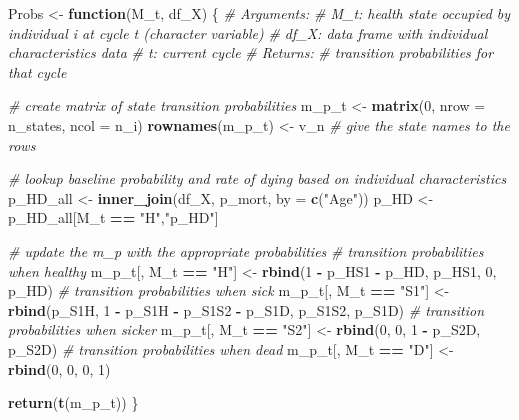 \documentclass[
]{article}
\newenvironment{Shaded}{\begin{snugshade}}{\end{snugshade}}
\newcommand{\CommentTok}[1]{\textcolor[rgb]{0.56,0.35,0.01}{\textit{#1}}}
\newcommand{\ControlFlowTok}[1]{\textcolor[rgb]{0.13,0.29,0.53}{\textbf{#1}}}
\newcommand{\DataTypeTok}[1]{\textcolor[rgb]{0.13,0.29,0.53}{#1}}
\newcommand{\DecValTok}[1]{\textcolor[rgb]{0.00,0.00,0.81}{#1}}
\newcommand{\KeywordTok}[1]{\textcolor[rgb]{0.13,0.29,0.53}{\textbf{#1}}}
\newcommand{\NormalTok}[1]{#1}
\newcommand{\OperatorTok}[1]{\textcolor[rgb]{0.81,0.36,0.00}{\textbf{#1}}}
\newcommand{\StringTok}[1]{\textcolor[rgb]{0.31,0.60,0.02}{#1}}
\begin{document}
\begin{Shaded}
\begin{Highlighting}[]
\NormalTok{Probs <-}\StringTok{ }\ControlFlowTok{function}\NormalTok{(M_t, df_X) \{ }
  \CommentTok{# Arguments:}
    \CommentTok{# M_t: health state occupied by individual i at cycle t (character variable)}
    \CommentTok{# df_X:     data frame with individual characteristics data }
  \CommentTok{# t:     current cycle }
\CommentTok{# Returns: }
  \CommentTok{#   transition probabilities for that cycle}
  
  \CommentTok{# create matrix of state transition probabilities  }
\NormalTok{  m_p_t           <-}\StringTok{ }\KeywordTok{matrix}\NormalTok{(}\DecValTok{0}\NormalTok{, }\DataTypeTok{nrow =}\NormalTok{ n_states, }\DataTypeTok{ncol =}\NormalTok{ n_i) }
  \KeywordTok{rownames}\NormalTok{(m_p_t) <-}\StringTok{  }\NormalTok{v_n  }\CommentTok{# give the state names to the rows}
  
  \CommentTok{# lookup baseline probability and rate of dying based on individual characteristics}
\NormalTok{  p_HD_all <-}\StringTok{ }\KeywordTok{inner_join}\NormalTok{(df_X, p_mort, }\DataTypeTok{by =} \KeywordTok{c}\NormalTok{(}\StringTok{"Age"}\NormalTok{))}
\NormalTok{  p_HD     <-}\StringTok{ }\NormalTok{p_HD_all[M_t }\OperatorTok{==}\StringTok{ "H"}\NormalTok{,}\StringTok{"p_HD"}\NormalTok{]}
  
  \CommentTok{# update the m_p with the appropriate probabilities   }
  \CommentTok{# transition probabilities when healthy}
\NormalTok{  m_p_t[, M_t }\OperatorTok{==}\StringTok{ "H"}\NormalTok{]  <-}\StringTok{ }\KeywordTok{rbind}\NormalTok{(}\DecValTok{1} \OperatorTok{-}\StringTok{ }\NormalTok{p_HS1 }\OperatorTok{-}\StringTok{ }\NormalTok{p_HD, p_HS1, }\DecValTok{0}\NormalTok{, p_HD)                              }
  \CommentTok{# transition probabilities when sick}
\NormalTok{  m_p_t[, M_t }\OperatorTok{==}\StringTok{ "S1"}\NormalTok{] <-}\StringTok{ }\KeywordTok{rbind}\NormalTok{(p_S1H, }\DecValTok{1} \OperatorTok{-}\StringTok{ }\NormalTok{p_S1H }\OperatorTok{-}\StringTok{ }\NormalTok{p_S1S2 }\OperatorTok{-}\StringTok{ }\NormalTok{p_S1D, p_S1S2, p_S1D)  }
  \CommentTok{# transition probabilities when sicker}
\NormalTok{  m_p_t[, M_t }\OperatorTok{==}\StringTok{ "S2"}\NormalTok{] <-}\StringTok{ }\KeywordTok{rbind}\NormalTok{(}\DecValTok{0}\NormalTok{, }\DecValTok{0}\NormalTok{, }\DecValTok{1} \OperatorTok{-}\StringTok{ }\NormalTok{p_S2D, p_S2D)                                            }
  \CommentTok{# transition probabilities when dead   }
\NormalTok{  m_p_t[, M_t }\OperatorTok{==}\StringTok{ "D"}\NormalTok{]  <-}\StringTok{ }\KeywordTok{rbind}\NormalTok{(}\DecValTok{0}\NormalTok{, }\DecValTok{0}\NormalTok{, }\DecValTok{0}\NormalTok{, }\DecValTok{1}\NormalTok{)                                                        }
  
  \KeywordTok{return}\NormalTok{(}\KeywordTok{t}\NormalTok{(m_p_t))}
\NormalTok{\}       }
\end{Highlighting}
\end{Shaded}
\end{document}
